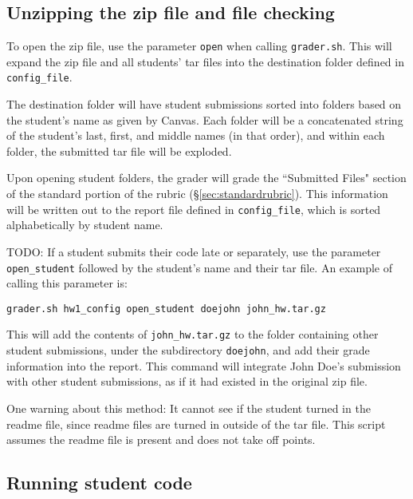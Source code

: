 \documentclass[12pt]{article}
\begin{document}
\subsection{Unzipping the zip file and file checking} \label{sec:unzipping}

To open the zip file, use the parameter \texttt{open} when calling \texttt{grader.sh}. This will expand the zip file and all students' tar files into the destination folder defined in \texttt{config\_file}.

The destination folder will have student submissions sorted into folders based on the student's name as given by Canvas. Each folder will be a concatenated string of the student's last, first, and middle names (in that order), and within each folder, the submitted tar file will be exploded.

Upon opening student folders, the grader will grade the ``Submitted Files" section of the standard portion of the rubric (\S\ref{sec:standardrubric}). This information will be written out to the report file defined in \texttt{config\_file}, which is sorted alphabetically by student name.

TODO: If a student submits their code late or separately, use the parameter \texttt{open\_student} followed by the student's name and their tar file. An example of calling this parameter is:

\vspace{5pt}

\texttt{grader.sh hw1\_config open\_student doejohn john\_hw.tar.gz}

\vspace{5pt}

This will add the contents of \texttt{john\_hw.tar.gz} to the folder containing other student submissions, under the subdirectory \texttt{doejohn}, and add their grade information into the report. This command will integrate John Doe's submission with other student submissions, as if it had existed in the original zip file.

One warning about this method: It cannot see if the student turned in the readme file, since readme files are turned in outside of the tar file. This script assumes the readme file is present and does not take off points.

\vspace{5pt}

\subsection{Running student code} \label{sec:runningcode}
\end{document}
